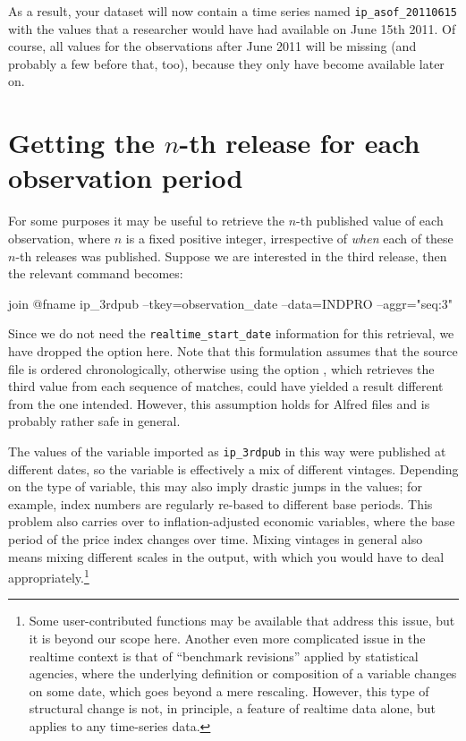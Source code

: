 As a result, your dataset will now contain a time series named
\verb|ip_asof_20110615| with the values that a researcher would have
had available on June 15th 2011. Of course, all values for the
observations after June 2011 will be missing (and probably a few
before that, too), because they only have become available later on.

\section{Getting the $n$-th release for each observation period}
\label{sec:realtime-nth}

For some purposes it may be useful to retrieve the $n$-th published
value of each observation, where $n$ is a fixed positive integer,
irrespective of \emph{when} each of these $n$-th releases was
published. Suppose we are interested in the third release, then the
relevant  command becomes:
\begin{code}
  join @fname ip_3rdpub --tkey=observation_date --data=INDPRO --aggr="seq:3"
\end{code}
Since we do not need the \verb|realtime_start_date| information for this 
retrieval, we have
dropped the  option here. Note that this formulation
assumes that the source file is ordered chronologically, otherwise
using the option , which retrieves the third
value from each sequence of matches, could have yielded a result
different from the one intended. However, this assumption holds for
Alfred files and is probably rather safe in general.

The values of the variable imported as \texttt{ip\_3rdpub} in this way
were published at different dates, so the variable is effectively a
mix of different vintages. Depending on the type of variable, this may
also imply drastic jumps in the values; for example, index numbers are
regularly re-based to different base periods. This problem also carries
over to inflation-adjusted economic variables, where the base period
of the price index changes over time. Mixing vintages in general also
means mixing different scales in the output, with which you would have
to deal appropriately.\footnote{Some user-contributed functions may be
  available that address this issue, but it is beyond our scope
  here. Another even more complicated issue in the realtime context is
  that of ``benchmark revisions'' applied by statistical agencies,
  where the underlying definition or composition of a variable changes
  on some date, which goes beyond a mere rescaling. However, this type
  of structural change is not, in principle, a feature of realtime
  data alone, but applies to any time-series data.}


